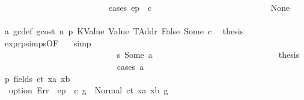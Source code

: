 \begin{isabellebody}
\ \ \ \ \ \ \ \ \ \ \ \ \ \ \ \ \ \ \ \ \ \ \ \ \isamarkupfalse%
\ {\isacharparenleft}{\kern0pt}cases\ {\isachardoublequoteopen}ep\ {\isachardollar}{\kern0pt}{\isachardollar}{\kern0pt}\ c{\isachardoublequoteclose}{\isacharparenright}{\kern0pt}\isanewline
\ \ \ \ \ \ \ \ \ \ \ \ \ \ \ \ \ \ \ \ \ \ \ \ \ \ \isamarkupfalse%
\ None\isanewline
\ \ \ \ \ \ \ \ \ \ \ \ \ \ \ \ \ \ \ \ \ \ \ \ \ \ \isamarkupfalse%
\ a{}\ gc{\isacharunderscore}{\kern0pt}def\ gcost\ n\ p{}\ KValue\ Value\ TAddr\ False\ Some\ c\ \isamarkupfalse%
\ {\isacharquery}{\kern0pt}thesis\ \isamarkupfalse%
\ expr{\isachardot}{\kern0pt}psimps{\isacharparenleft}{\kern0pt}{}{}{\isacharparenright}{\kern0pt}{\isacharbrackleft}{\kern0pt}OF\ {}{}{\isacharparenleft}{\kern0pt}{}{\isacharparenright}{\kern0pt}{\isacharbrackright}{\kern0pt}\ \isamarkupfalse%
\ simp\isanewline
\ \ \ \ \ \ \ \ \ \ \ \ \ \ \ \ \ \ \ \ \ \ \ \ \isamarkupfalse%
\isanewline
\ \ \ \ \ \ \ \ \ \ \ \ \ \ \ \ \ \ \ \ \ \ \ \ \ \ \isamarkupfalse%
\ s{}{\isacharcolon}{\kern0pt}\ {\isacharparenleft}{\kern0pt}Some\ a{\isacharparenright}{\kern0pt}\isanewline
\ \ \ \ \ \ \ \ \ \ \ \ \ \ \ \ \ \ \ \ \ \ \ \ \ \ \isamarkupfalse%
\ \isamarkupfalse%
\ {\isacharquery}{\kern0pt}thesis\isanewline
\ \ \ \ \ \ \ \ \ \ \ \ \ \ \ \ \ \ \ \ \ \ \ \ \ \ \isamarkupfalse%
\ {\isacharparenleft}{\kern0pt}cases\ a{\isacharparenright}{\kern0pt}\isanewline
\ \ \ \ \ \ \ \ \ \ \ \ \ \ \ \ \ \ \ \ \ \ \ \ \ \ \ \ \isamarkupfalse%
\ p{}{\isacharcolon}{\kern0pt}\ {\isacharparenleft}{\kern0pt}fields\ ct\ xa\ xb{\isacharparenright}{\kern0pt}\isanewline
\ \ \ \ \ \ \ \ \ \ \ \ \ \ \ \ \ \ \ \ \ \ \ \ \ \ \ \ \isamarkupfalse%
\ \isamarkupfalse%
\ {}{\isacharcolon}{\kern0pt}\ {\isachardoublequoteopen}option\ Err\ {\isacharparenleft}{\kern0pt}{\isasymlambda}{\isacharunderscore}{\kern0pt}{\isachardot}{\kern0pt}\ ep\ {\isachardollar}{\kern0pt}{\isachardollar}{\kern0pt}\ c{\isacharparenright}{\kern0pt}\ g{\isacharprime}{\kern0pt}\ {\isacharequal}{\kern0pt}\ Normal\ {\isacharparenleft}{\kern0pt}{\isacharparenleft}{\kern0pt}ct{\isacharcomma}{\kern0pt}\ xa{\isacharcomma}{\kern0pt}\ xb{\isacharparenright}{\kern0pt}{\isacharcomma}{\kern0pt}\ g{\isacharprime}{\kern0pt}{\isacharparenright}{\kern0pt}{\isachardoublequoteclose}\ \isamarkupfalse%

\end{isabellebody}
